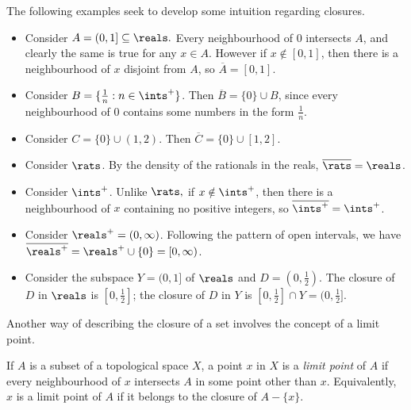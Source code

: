 The following examples seek to develop some intuition regarding closures.
\begin{itemize}
    \item Consider $A = (0, 1] \subseteq \reals.$ Every neighbourhood of $0$ intersects $A$, and clearly the same is true for any $x \in A$. However if $x \notin [0, 1]$, then there is a neighbourhood of $x$ disjoint from $A$, so $\overline{A} = [0, 1]$.
    \item Consider $B = \{\frac1n : n \in \ints^+\}$. Then $\overline{B} = \{0\} \cup B$, since every neighbourhood of $0$ contains some numbers in the form $\frac1n$.
    \item Consider $C = \{0\} \cup (1, 2)$. Then $\overline{C} = \{0\} \cup [1, 2]$.
    \item Consider $\rats$. By the density of the rationals in the reals, $\overline{\rats} = \reals$.
    \item Consider $\ints^+$. Unlike $\rats,$ if $x \notin \ints^+$, then there is a neighbourhood of $x$ containing no positive integers, so $\overline{\ints^+} = \ints^+$.
    \item Consider $\reals^+ = (0, \infty)$. Following the pattern of open intervals, we have $\overline{\reals^+} = \reals^+ \cup \{0\} = [0, \infty)$.
    \item Consider the subspace $Y = (0, 1]$ of $\reals$ and $D = (0, \frac12)$. The closure of $D$ in $\reals$ is $[0, \frac12]$; the closure of $D$ in $Y$ is $[0, \frac12] \cap Y = (0, \frac12]$.
\end{itemize}

Another way of describing the closure of a set involves the concept of a limit point.
\begin{definition}\label{2.26}
    If $A$ is a subset of a topological space $X$, a point $x$ in $X$ is a {\it limit point} of $A$ if every neighbourhood of $x$ intersects $A$ in some point other than $x$. Equivalently, $x$ is a limit point of $A$ if it belongs to the closure of $A - \{x\}$.
\end{definition}


